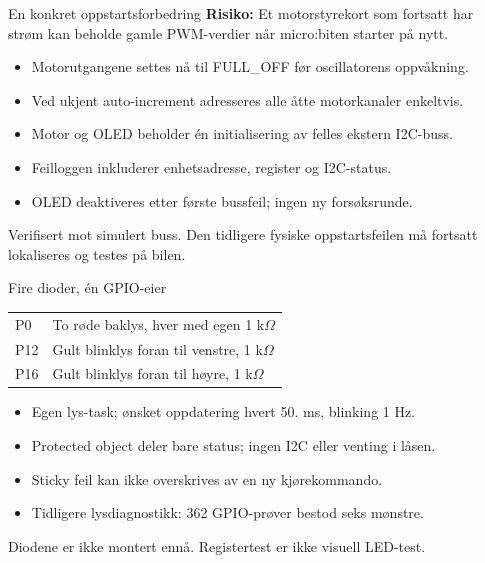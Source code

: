 \documentclass[aspectratio=169,11pt]{beamer}
\begin{document}
\begin{frame}{En konkret oppstartsforbedring}
\textbf{Risiko:} Et motorstyrekort som fortsatt har strøm kan beholde gamle
PWM-verdier når micro:biten starter på nytt.
\vspace{5mm}
\begin{itemize}
\item Motorutgangene settes nå til FULL\_OFF før oscillatorens oppvåkning.
\item Ved ukjent auto-increment adresseres alle åtte motorkanaler enkeltvis.
\item Motor og OLED beholder én initialisering av felles ekstern I2C-buss.
\item Feilloggen inkluderer enhetsadresse, register og I2C-status.
\item OLED deaktiveres etter første bussfeil; ingen ny forsøksrunde.
\end{itemize}
\vspace{5mm}
\alert{Verifisert mot simulert buss. Den tidligere fysiske oppstartsfeilen
må fortsatt lokaliseres og testes på bilen.}
\end{frame}

\begin{frame}{Fire dioder, én GPIO-eier}
\begin{tabular}{@{}ll@{}}\toprule
P0 & To røde baklys, hver med egen 1 k$\Omega$\\
P12 & Gult blinklys foran til venstre, 1 k$\Omega$\\
P16 & Gult blinklys foran til høyre, 1 k$\Omega$\\\bottomrule
\end{tabular}\par\vspace{5mm}
\begin{itemize}
\item Egen lys-task; ønsket oppdatering hvert 50. ms, blinking 1 Hz.
\item Protected object deler bare status; ingen I2C eller venting i låsen.
\item Sticky feil kan ikke overskrives av en ny kjørekommando.
\item Tidligere lysdiagnostikk: 362 GPIO-prøver bestod seks mønstre.
\end{itemize}
\vspace{3mm}
\alert{Diodene er ikke montert ennå. Registertest er ikke visuell LED-test.}
\end{frame}
\end{document}
